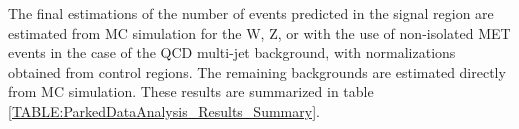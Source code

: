 
The final estimations of the number of events predicted in the signal region are estimated from \gls{MC} simulation for the W, Z, or with the use of non-isolated \gls{MET} events in the case of the \gls{QCD} multi-jet background, with normalizations obtained from control regions. The remaining backgrounds are estimated directly from \gls{MC} simulation. These results are summarized in table \ref{TABLE:ParkedDataAnalysis_Results_Summary}.





